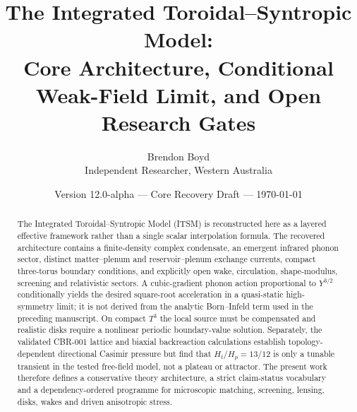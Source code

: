 \documentclass[11pt]{article}
\title{The Integrated Toroidal--Syntropic Model:\\
Core Architecture, Conditional Weak-Field Limit, and Open Research Gates}
\author{Brendon Boyd\\Independent Researcher, Western Australia}
\date{Version 12.0-alpha --- Core Recovery Draft --- \today}
\newcommand{\Tthree}{T^3}
\begin{document}
\maketitle

\begin{center}
\end{center}

\begin{abstract}
The Integrated Toroidal--Syntropic Model (ITSM) is reconstructed here as a
layered effective framework rather than a single scalar interpolation formula.
The recovered architecture contains a finite-density complex condensate, an
emergent infrared phonon sector, distinct matter--plenum and
reservoir--plenum exchange currents, compact three-torus boundary conditions,
and explicitly open wake, circulation, shape-modulus, screening and
relativistic sectors.  A cubic-gradient phonon action proportional to
$Y^{3/2}$ conditionally yields the desired square-root acceleration in a
quasi-static high-symmetry limit; it is not derived from the analytic
Born--Infeld term used in the preceding manuscript.  On compact $\Tthree$ the
local source must be compensated and realistic disks require a nonlinear
periodic boundary-value solution.  Separately, the validated CBR-001 lattice
and biaxial backreaction calculations establish topology-dependent directional
Casimir pressure but find that $H_t/H_p=13/12$ is only a tunable transient in
the tested free-field model, not a plateau or attractor.  The present work
therefore defines a conservative theory architecture, a strict claim-status
vocabulary and a dependency-ordered programme for microscopic matching,
screening, lensing, disks, wakes and driven anisotropic stress.
\end{abstract}

\tableofcontents











\end{document}
